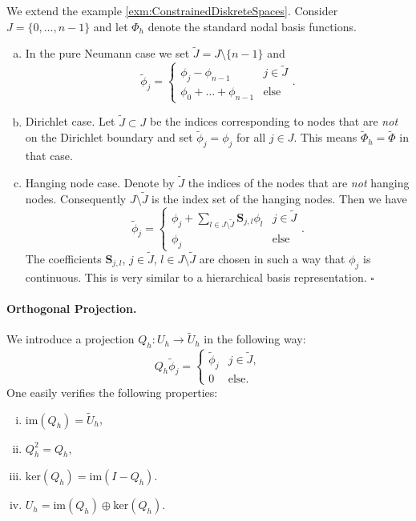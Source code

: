 \begin{Exm}\label{exm:BasisTransformation}
We extend the example \ref{exm:ConstrainedDiskreteSpaces}.
Consider $J = \{0,\ldots,n-1\}$ and let $\Phi_h$ denote the standard
  nodal basis functions.
\begin{enumerate}[a)]
\item In the pure Neumann case we set $\tilde{J} = J \setminus
  \{n-1\}$ and 
\begin{equation*}
\tilde\phi_j = \left\{\begin{array}{ll}
\phi_j - \phi_{n-1} & j \in \tilde{J}\\
\phi_0 + \ldots + \phi_{n-1} & \text{else}
\end{array}\right. .
\end{equation*}
\item Dirichlet case. Let $\tilde{J}\subset J$ be the indices
  corresponding to nodes that are \textit{not} on the Dirichlet
  boundary and set $\tilde\phi_j = \phi_j$ for all $j\in J$. This
  means $\tilde\Phi_h = \tilde\Phi$ in that case.
\item Hanging node case. Denote by $\tilde{J}$ the indices of the
  nodes that are \textit{not} hanging nodes. Consequently
  $J\setminus\tilde{J}$ is the index set of the hanging nodes. Then we
  have 
\begin{equation*}
\tilde\phi_j = \left\{\begin{array}{ll}
\phi_j + \sum_{l\in J\setminus\tilde{J}} \mathbf{S}_{j,l} \phi_{l} & j \in \tilde{J}\\
\phi_j & \text{else}
\end{array}\right. .
\end{equation*}
The coefficients $\mathbf{S}_{j,l}$, $j \in \tilde{J}$, $l\in
J\setminus\tilde{J}$ are chosen in such a way that $\phi_j$ is
continuous. This is very similar to a hierarchical basis
representation. \hfill$\square$
\end{enumerate}
\end{Exm}

\paragraph{Orthogonal Projection.}
We introduce a projection $Q_h : U_h \to \tilde{U}_h$ in the following way:
\begin{equation*}
Q_h \tilde\phi_j = \left\{\begin{array}{ll}
\tilde\phi_j & j\in\tilde{J},\\
0 & \text{else}.
\end{array}\right.
\end{equation*}
One easily verifies the following properties:
\begin{enumerate}[i)]
\item $\text{im}(Q_h) = \tilde{U}_h$,
\item $Q_h^2 = Q_h$,
\item $\text{ker}(Q_h) = \text{im}(I-Q_h)$.
\item $U_h = \text{im}(Q_h) \oplus \text{ker}(Q_h)$.
\end{enumerate}

